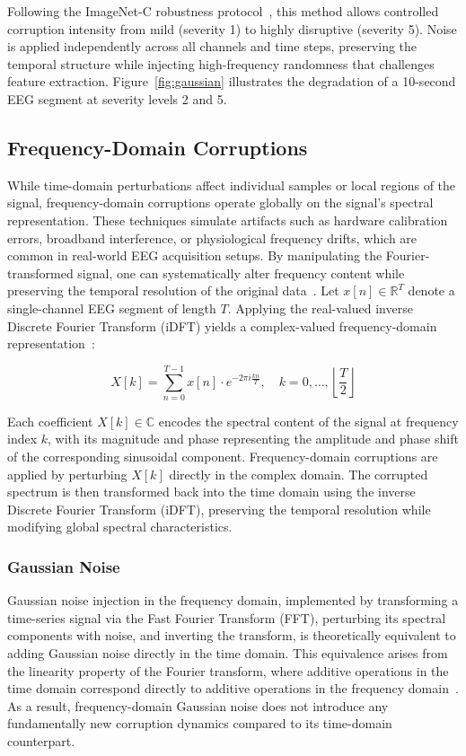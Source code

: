 Following the ImageNet-C robustness protocol~\cite{benchmarkingneuralnetworkrobustness}, this method allows controlled corruption intensity from mild (severity 1) to highly disruptive (severity 5). Noise is applied independently across all channels and time steps, preserving the temporal structure while injecting high-frequency randomness that challenges feature extraction. Figure~\ref{fig:gaussian} illustrates the degradation of a 10-second EEG segment at severity levels 2 and 5.

\subsection{Frequency-Domain Corruptions}
While time-domain perturbations affect individual samples or local regions of the signal, frequency-domain corruptions operate globally on the signal's spectral representation. These techniques simulate artifacts such as hardware calibration errors, broadband interference, or physiological frequency drifts, which are common in real-world EEG acquisition setups. By manipulating the Fourier-transformed signal, one can systematically alter frequency content while preserving the temporal resolution of the original data~\cite{gaussian2}.
Let \( x[n] \in \mathbb{R}^T \) denote a single-channel EEG segment of length \( T \). Applying the real-valued inverse Discrete Fourier Transform (iDFT) yields a complex-valued frequency-domain representation~\cite{eeg}:

\begin{equation}
X[k] = \sum_{n=0}^{T-1} x[n] \cdot e^{-2\pi i \frac{kn}{T}}, \quad k = 0, \dots, \left\lfloor \frac{T}{2} \right\rfloor
\end{equation}

Each coefficient \( X[k] \in \mathbb{C} \) encodes the spectral content of the signal at frequency index \(k\), with its magnitude and phase representing the amplitude and phase shift of the corresponding sinusoidal component. Frequency-domain corruptions are applied by perturbing \( X[k] \) directly in the complex domain. The corrupted spectrum is then transformed back into the time domain using the inverse Discrete Fourier Transform (iDFT), preserving the temporal resolution while modifying global spectral characteristics.

\subsubsection{Gaussian Noise}
Gaussian noise injection in the frequency domain, implemented by transforming a time-series signal via the Fast Fourier Transform (FFT), perturbing its spectral components with noise, and inverting the transform, is theoretically equivalent to adding Gaussian noise directly in the time domain. This equivalence arises from the linearity property of the Fourier transform, where additive operations in the time domain correspond directly to additive operations in the frequency domain~\cite{gaussian2}. As a result, frequency-domain Gaussian noise does not introduce any fundamentally new corruption dynamics compared to its time-domain counterpart.

